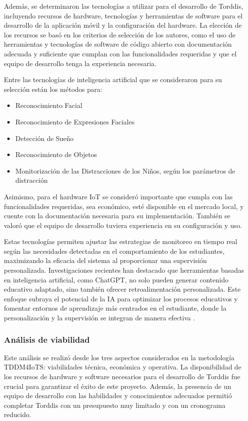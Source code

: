 \documentclass[a4paper,fleqn]{cas-sc}
\begin{document}
					Además, se determinaron las tecnologías a utilizar para el desarrollo de Torddis, incluyendo recursos de hardware, tecnologías y herramientas de software para el desarrollo de la aplicación móvil y la configuración del hardware. La elección de los recursos se basó en los criterios de selección de los autores, como el uso de herramientas y tecnologías de software de código abierto con documentación adecuada y suficiente que cumplan con las funcionalidades requeridas y que el equipo de desarrollo tenga la experiencia necesaria.
					
					Entre las tecnologías de inteligencia artificial que se consideraron para su selección están los métodos para:
					
					\begin{itemize}
						\item Reconocimiento Facial
						\item Reconocimiento de Expresiones Faciales
						\item Detección de Sueño
						\item Reconocimiento de Objetos
						\item Monitorización de las Distracciones de los Niños, según los parámetros de distracción
					\end{itemize} 
					Asimismo, para el hardware IoT se consideró importante que cumpla con las funcionalidades requeridas, sea económico, esté disponible en el mercado local, y cuente con la documentación necesaria para su implementación. También se valoró que el equipo de desarrollo tuviera experiencia en su configuración y uso.
					
					Estas tecnologías permiten ajustar las estrategias de monitoreo en tiempo real según las necesidades detectadas en el comportamiento de los estudiantes, maximizando la eficacia del sistema al proporcionar una supervisión personalizada. Investigaciones recientes han destacado que herramientas basadas en inteligencia artificial, como ChatGPT, no solo pueden generar contenido educativo adaptado, sino también ofrecer retroalimentación personalizada. Este enfoque subraya el potencial de la IA para optimizar los procesos educativos y fomentar entornos de aprendizaje más centrados en el estudiante, donde la personalización y la supervisión se integran de manera efectiva \citep{Wang2025Development, Li2024Systematic}.
				
				\subsubsection*{Análisis de viabilidad}
					Este análisis se realizó desde los tres aspectos considerados en la metodología TDDM4IoTS: viabilidades técnica, económica y operativa. La disponibilidad de los recursos de hardware y software necesarios para el desarrollo de Torddis fue crucial para garantizar el éxito de este proyecto. Además, la presencia de un equipo de desarrollo con las habilidades y conocimientos adecuados permitió completar Torddis con un presupuesto muy limitado y con un cronograma reducido.
				
\end{document}

